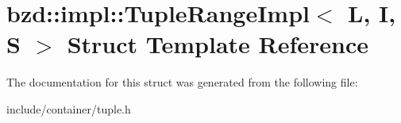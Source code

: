 \hypertarget{structbzd_1_1impl_1_1TupleRangeImpl}{}\section{bzd\+:\+:impl\+:\+:Tuple\+Range\+Impl$<$ L, I, S $>$ Struct Template Reference}
\label{structbzd_1_1impl_1_1TupleRangeImpl}


The documentation for this struct was generated from the following file\+:\begin{DoxyCompactItemize}
\item 
include/container/tuple.\+h\end{DoxyCompactItemize}
